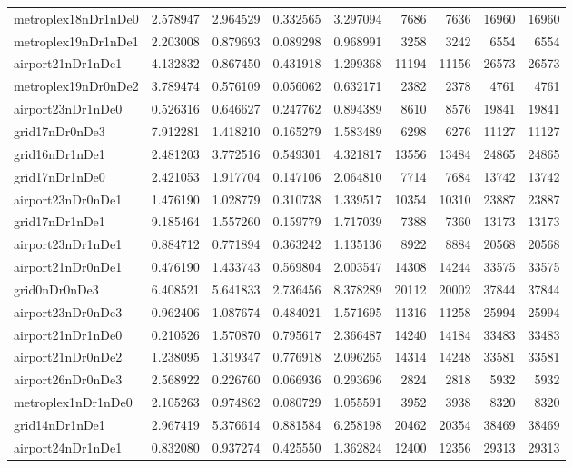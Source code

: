 \begin{longtable}{|l|r|r|r|r|r|r|r|r|}
metroplex18nDr1nDe0 & 2.578947 & 2.964529 & 0.332565 & 3.297094 & 7686 & 7636 & 16960 & 16960 \\
metroplex19nDr1nDe1 & 2.203008 & 0.879693 & 0.089298 & 0.968991 & 3258 & 3242 & 6554 & 6554 \\
airport21nDr1nDe1 & 4.132832 & 0.867450 & 0.431918 & 1.299368 & 11194 & 11156 & 26573 & 26573 \\
metroplex19nDr0nDe2 & 3.789474 & 0.576109 & 0.056062 & 0.632171 & 2382 & 2378 & 4761 & 4761 \\
airport23nDr1nDe0 & 0.526316 & 0.646627 & 0.247762 & 0.894389 & 8610 & 8576 & 19841 & 19841 \\
grid17nDr0nDe3 & 7.912281 & 1.418210 & 0.165279 & 1.583489 & 6298 & 6276 & 11127 & 11127 \\
grid16nDr1nDe1 & 2.481203 & 3.772516 & 0.549301 & 4.321817 & 13556 & 13484 & 24865 & 24865 \\
grid17nDr1nDe0 & 2.421053 & 1.917704 & 0.147106 & 2.064810 & 7714 & 7684 & 13742 & 13742 \\
airport23nDr0nDe1 & 1.476190 & 1.028779 & 0.310738 & 1.339517 & 10354 & 10310 & 23887 & 23887 \\
grid17nDr1nDe1 & 9.185464 & 1.557260 & 0.159779 & 1.717039 & 7388 & 7360 & 13173 & 13173 \\
airport23nDr1nDe1 & 0.884712 & 0.771894 & 0.363242 & 1.135136 & 8922 & 8884 & 20568 & 20568 \\
airport21nDr0nDe1 & 0.476190 & 1.433743 & 0.569804 & 2.003547 & 14308 & 14244 & 33575 & 33575 \\
grid0nDr0nDe3 & 6.408521 & 5.641833 & 2.736456 & 8.378289 & 20112 & 20002 & 37844 & 37844 \\
airport23nDr0nDe3 & 0.962406 & 1.087674 & 0.484021 & 1.571695 & 11316 & 11258 & 25994 & 25994 \\
airport21nDr1nDe0 & 0.210526 & 1.570870 & 0.795617 & 2.366487 & 14240 & 14184 & 33483 & 33483 \\
airport21nDr0nDe2 & 1.238095 & 1.319347 & 0.776918 & 2.096265 & 14314 & 14248 & 33581 & 33581 \\
airport26nDr0nDe3 & 2.568922 & 0.226760 & 0.066936 & 0.293696 & 2824 & 2818 & 5932 & 5932 \\
metroplex1nDr1nDe0 & 2.105263 & 0.974862 & 0.080729 & 1.055591 & 3952 & 3938 & 8320 & 8320 \\
grid14nDr1nDe1 & 2.967419 & 5.376614 & 0.881584 & 6.258198 & 20462 & 20354 & 38469 & 38469 \\
airport24nDr1nDe1 & 0.832080 & 0.937274 & 0.425550 & 1.362824 & 12400 & 12356 & 29313 & 29313 \\

\end{longtable}
